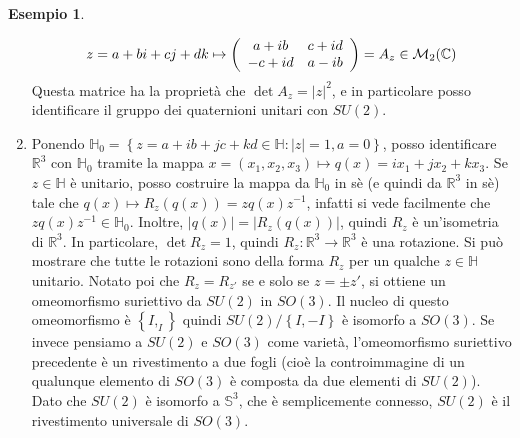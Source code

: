 \documentclass[a4paper,11pt]{article}
\theoremstyle{definition}
\newtheorem{esempio}{Esempio}[section]
\theoremstyle{theorem}
\begin{document}
\begin{esempio}
\begin{enumerate}
		\[z=a+bi+cj+dk\mapsto \left(\begin{array}{c c}
		a+ib & c+id \\
		-c+id & a-ib
		\end{array}\right)=A_z\in\mathcal{M}_2(\mathbb{C})\]
		Questa matrice ha la proprietà che $\det A_z=|z|^2$, e in particolare posso identificare il gruppo dei quaternioni unitari con $SU(2)$.
		\item Ponendo $\mathbb{H}_0=\left\{z=a+ib+jc+kd\in\mathbb{H}:|z|=1,a=0\right\}$, posso identificare $\mathbb{R}^3$ con $\mathbb{H}_0$ tramite la mappa $x=(x_1,x_2,x_3)\mapsto q(x)=ix_1+jx_2+kx_3$. Se $z\in\mathbb{H}$ è unitario, posso costruire la mappa da $\mathbb{H}_0$ in sè (e quindi da $\mathbb{R}^3$ in sè) tale che $q(x)\mapsto R_z(q(x))=zq(x)z^{-1}$, infatti si vede facilmente che $zq(x)z^{-1}\in\mathbb{H}_0$. Inoltre, $|q(x)|=|R_z(q(x))|$, quindi $R_z$ è un'isometria di $\mathbb{R}^3$. In particolare, $\det R_z=1$, quindi $R_z\colon\mathbb{R}^3\to\mathbb{R}^3$ è una rotazione. Si può mostrare che tutte le rotazioni sono della forma $R_z$ per un qualche $z\in\mathbb{H}$ unitario. Notato poi che $R_z=R_{z'}$ se e solo se $z=\pm z'$, si ottiene un omeomorfismo suriettivo da $SU(2)$ in $SO(3)$. Il nucleo di questo omeomorfismo è $\left\{I,_I\right\}$ quindi $SU(2)/\left\{I,-I\right\}$ è isomorfo a $SO(3)$. Se invece pensiamo a $SU(2)$ e $SO(3)$ come varietà, l'omeomorfismo suriettivo precedente è un rivestimento a due fogli (cioè la controimmagine di un qualunque elemento di $SO(3)$ è composta da due elementi di $SU(2)$). Dato che $SU(2)$ è isomorfo a $\mathbb{S}^3$, che è semplicemente connesso, $SU(2)$ è il rivestimento universale di $SO(3)$.
		
	\end{enumerate}
\end{esempio}
\newpage
\end{document}
